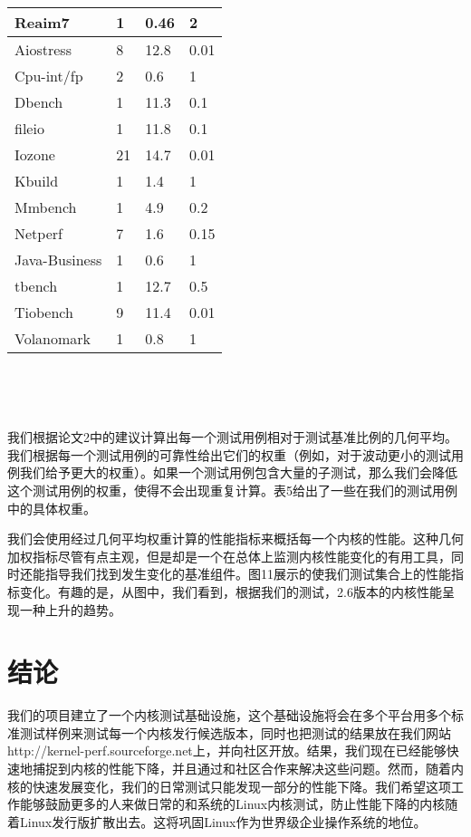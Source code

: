 {
\center
{}
\tabletail{\hline}

\begin{supertabular}{|p{2.5cm}|p{2.5cm}|p{2.5cm}|p{2.5cm}|}
\hline
Reaim7 & 1 & 0.46 & 2\\
\hline
Aiostress & 8 & 12.8 & 0.01\\
\hline
Cpu-int/fp & 2 & 0.6 & 1\\
\hline 
Dbench & 1 & 11.3 & 0.1\\
\hline
fileio & 1 & 11.8 & 0.1\\
\hline
Iozone & 21 & 14.7 & 0.01\\
\hline
Kbuild & 1 & 1.4 & 1\\
\hline
Mmbench & 1 & 4.9 & 0.2\\
\hline
Netperf & 7 & 1.6 & 0.15\\
\hline
Java-Business & 1 & 0.6 & 1\\
\hline
tbench & 1 & 12.7 & 0.5\\
\hline
Tiobench & 9 & 11.4 & 0.01\\
\hline
Volanomark & 1 & 0.8 &1\\
\end{supertabular}
\ 

}

\ 

我们根据论文2中的建议计算出每一个测试用例相对于测试基准比例的几何平均。我们根据每一个测试用例的可靠性给出它们的权重（例如，对于波动更小的测试用例我们给予更大的权重）。如果一个测试用例包含大量的子测试，那么我们会降低这个测试用例的权重，使得不会出现重复计算。表5给出了一些在我们的测试用例中的具体权重。

我们会使用经过几何平均权重计算的性能指标来概括每一个内核的性能。这种几何加权指标尽管有点主观，但是却是一个在总体上监测内核性能变化的有用工具，同时还能指导我们找到发生变化的基准组件。图11展示的使我们测试集合上的性能指标变化。有趣的是，从图中，我们看到，根据我们的测试，2.6版本的内核性能呈现一种上升的趋势。

\section{结论}
我们的项目建立了一个内核测试基础设施，这个基础设施将会在多个平台用多个标准测试样例来测试每一个内核发行候选版本，同时也把测试的结果放在我们网站http://kernel-perf.sourceforge.net上，并向社区开放。结果，我们现在已经能够快速地捕捉到内核的性能下降，并且通过和社区合作来解决这些问题。然而，随着内核的快速发展变化，我们的日常测试只能发现一部分的性能下降。我们希望这项工作能够鼓励更多的人来做日常的和系统的Linux内核测试，防止性能下降的内核随着Linux发行版扩散出去。这将巩固Linux作为世界级企业操作系统的地位。
